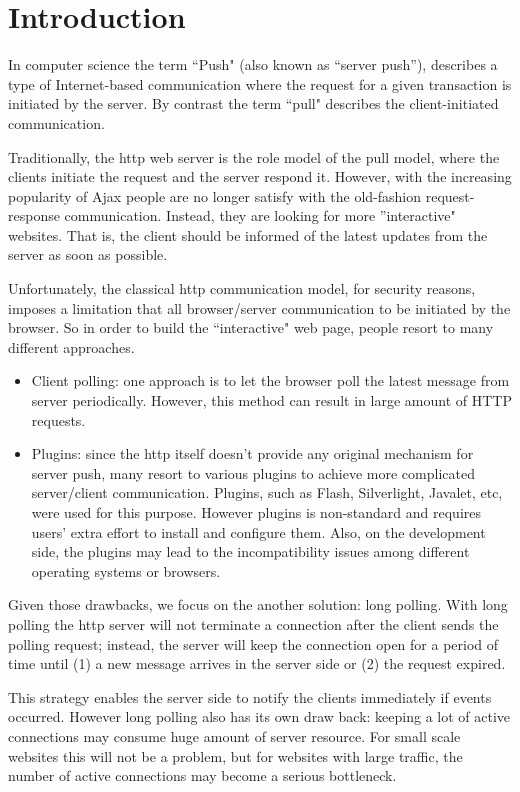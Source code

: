 \section {Introduction}
In computer science the term ``Push" (also known as ``server push''), describes a type of Internet-based communication where the request for a given transaction is initiated by the server. By contrast the term ``pull" describes the client-initiated communication\cite{PushOverview}.

Traditionally, the http web server is the role model of the pull model, where the clients initiate the request and the server respond it. However, with the increasing popularity of Ajax\cite{Ajax} people are no longer satisfy with the old-fashion request-response communication. Instead, they are looking for more ''interactive" websites. That is, the client should be informed of the latest updates from the server as soon as possible.  

Unfortunately, the classical http communication model, for security reasons, imposes a limitation that all browser/server communication to be initiated by the browser. So in order to build the ``interactive" web page, people resort to many different approaches.

\begin{itemize}
\item Client polling: one approach is to let the browser poll the latest message from server periodically. However, this method can result in large amount of HTTP requests.
\item Plugins: since the http itself doesn't provide any original mechanism for server push, many resort to various plugins to achieve more complicated server/client communication. Plugins, such as Flash, Silverlight, Javalet, etc, were used for this purpose. However plugins is non-standard and requires users' extra effort to install and configure them. Also, on the development side, the plugins may lead to the incompatibility issues among different operating systems or browsers. 
\end{itemize}

Given those drawbacks, we focus on the another solution: long polling\cite{LongPolling}.  With long polling the http server will not terminate a connection after the client sends the polling request; instead, the server will keep the connection open for a period of time until (1) a new message arrives in the server side or (2) the request expired. 

This strategy enables the server side to notify the clients immediately if events occurred. However long polling also has its own draw back: keeping a lot of active connections may consume huge amount of server resource. For small scale websites this will not be a problem, but for websites with large traffic, the number of active connections may become a serious bottleneck.


